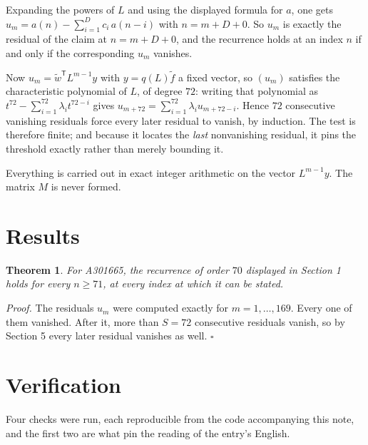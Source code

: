 \documentclass[11pt]{article}
\newtheorem{theorem}{Theorem}
\theoremstyle{definition}
\begin{document}
Expanding the powers of $L$ and using the displayed formula for $a$, one gets $u_m = a(n) - \sum_{i=1}^{D} c_i\,a(n-i)$ with $n = m + D + 0$. So $u_m$ is exactly the residual of the claim at $n = m + D + 0$, and the recurrence holds at an index $n$ if and only if the corresponding $u_m$ vanishes.

Now $u_m = \tilde w^{\mathsf T} L^{m-1} y$ with $y = q(L)\tilde f$ a fixed vector, so $(u_m)$ satisfies the characteristic polynomial of $L$, of degree $72$: writing that polynomial as $t^{72} - \sum_{i=1}^{72} \lambda_i t^{72-i}$ gives $u_{m+72} = \sum_{i=1}^{72} \lambda_i u_{m+72-i}$. Hence $72$ consecutive vanishing residuals force every later residual to vanish, by induction. The test is therefore finite; and because it locates the {\itshape last} nonvanishing residual, it pins the threshold exactly rather than merely bounding it.

Everything is carried out in exact integer arithmetic on the vector $L^{m-1}y$. The matrix $M$ is never formed.

\section{Results}

\begin{theorem} For A301665, the recurrence of order $70$ displayed in Section 1 holds for every $n \ge 71$, at every index at which it can be stated.\end{theorem}

{\itshape Proof.} The residuals $u_m$ were computed exactly for $m = 1,\dots,169$. Every one of them vanished. After it, more than $S = 72$ consecutive residuals vanish, so by Section 5 every later residual vanishes as well. $\square$

\section{Verification}

Four checks were run, each reproducible from the code accompanying this note, and the first two are what pin the reading of the entry's English.
\end{document}
